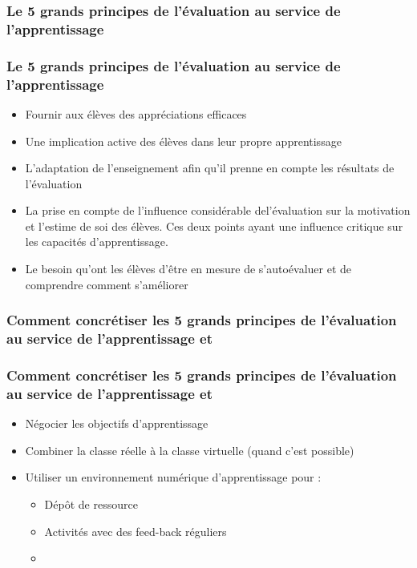 \documentclass[aspectratio=169]{beamer}
\begin{document}
			\subsubsection{Le 5 grands principes de l'évaluation au service de l'apprentissage \citep{black2004}} 
				\begin{frame}
			 		\frametitle{Le 5 grands principes de l'évaluation au service de l'apprentissage\citep{black2004}}
					\begin {itemize}
						\item Fournir aux élèves des appréciations efficaces
						\item Une implication active des élèves dans leur propre apprentissage
						\item L'adaptation de l'enseignement afin qu'il prenne en compte les résultats de l'évaluation
						\item La prise en compte de l'influence considérable del'évaluation sur la motivation et l'estime de soi des élèves. Ces deux points ayant une influence critique sur les capacités d'apprentissage.
						\item Le besoin qu'ont les élèves d'être en mesure de s'autoévaluer et de comprendre comment s'améliorer
					\end{itemize}
				\end{frame}
				
				\subsubsection{Comment concrétiser les 5 grands principes de l'évaluation au service de l'apprentissage \citep{Missaoui2013}et \citep{itslearning2012a} }
				\begin{frame}
			 		\frametitle{Comment concrétiser les 5 grands principes de l'évaluation au service de l'apprentissage \citep{Missaoui2013} et \citep{itslearning2012a}}
					\begin {itemize}
						\item Négocier les objectifs d'apprentissage
						\item Combiner la classe réelle à la classe virtuelle (quand c'est possible)
						\item Utiliser un environnement numérique d'apprentissage pour :
							\begin {itemize}
								\item Dépôt de ressource
								\item Activités avec des feed-back réguliers
								\item 
							\end{itemize}
						
					\end{itemize}
				\end{frame}
			
\end{document}
